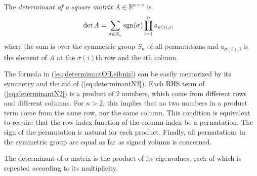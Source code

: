 \begin{defn}
  \label{def:determinantOfLeibniz}
  The \emph{determinant of a square matrix}
  $A\in \mathbb{R}^{n\times n}$
  is 
  \begin{equation}
    \label{eq:determinantOfLeibniz}
    \det A = \sum_{\sigma\in S_n} \mathrm{sgn}(\sigma) \prod_{i=1}^n
    a_{\sigma(i),i},
  \end{equation}
  where the sum is over 
  the symmetric group $S_n$ of all permutations
  and $a_{\sigma(i),i}$ is the element of $A$
  at the $\sigma(i)$th row and the $i$th column.
\end{defn}

\begin{rem}
  The formula in (\ref{eq:determinantOfLeibniz})
  can be easily memorized by its symmetry
  and the aid of (\ref{eq:determinantN2}).
  Each RHS term of (\ref{eq:determinantN2}) is a product of $2$
  numbers,
  which come from different rows and different columns.
  For $n>2$, this implies that
  no two numbers in a product term
  come from the same row, nor the same column.
  This condition is equivalent to require
  that the row index function of the column index
  be a permutation.
  The sign of the permutation is natural
  for each product.
  Finally, all permutations in the symmetric group
  are equal as far as signed volumn is concerned.
\end{rem}

\begin{lem}
  \label{lem:determinantIsProductOfEigenvalues}
  The determinant of a matrix is the product of its eigenvalues, 
  each of which is repeated according to its multiplicity.
\end{lem}

